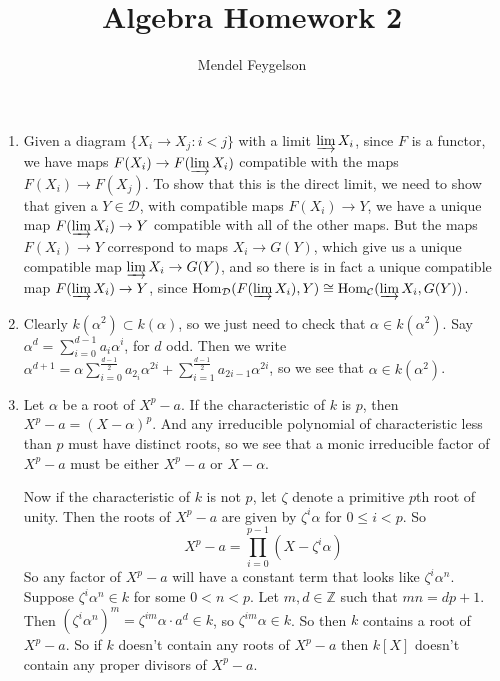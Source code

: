 \documentclass{article}
\title{Algebra Homework 2}
\author{Mendel Feygelson}
\newcommand\ZZ{\mathbb Z}
\newcommand\C{\mathcal C}
\newcommand\D{\mathcal D}
\DeclareMathOperator\Hom{Hom}
\begin{document}
\maketitle
\begin{enumerate}

   \item Given a diagram $\{X_i \to X_j : i < j\}$ with a limit $\varinjlim
      X_i$, since $F$ is a functor, we have maps $F(X_i) \to F(\varinjlim X_i)$
      compatible with the maps $F(X_i) \to F(X_j)$. To show that this is the
      direct limit, we need to show that given a $Y \in \D$, with compatible
      maps $F(X_i) \to Y$, we have a unique map $F(\varinjlim X_i) \to Y$
      compatible with all of the other maps. But the maps $F(X_i) \to Y$
      correspond to maps $X_i \to G(Y)$, which give us a unique compatible map
      $\varinjlim X_i \to G(Y)$, and so there is in fact a unique compatible map
      $F(\varinjlim X_i) \to Y$, since $\Hom_\D(F(\varinjlim X_i), Y) \cong
      \Hom_\C(\varinjlim X_i, G(Y))$.

   \item Clearly $k(\alpha^2) \subset k(\alpha)$, so we just need to check that
      $\alpha \in k(\alpha^2)$. Say $\alpha^d = \sum_{i=0}^{d-1} a_i\alpha^i$,
      for $d$ odd. Then we write $\alpha^{d+1} = \alpha\sum_{i=0}^{\frac{d-1}2}
      a_{2_i}\alpha^{2i} + \sum_{i=1}^{\frac{d-1}2} a_{2i-1}\alpha^{2i}$, so we
      see that $\alpha \in k(\alpha^2)$.

   \item Let $\alpha$ be a root of $X^p-a$. If the characteristic of $k$ is $p$,
      then $X^p-a = (X-\alpha)^p$. And any irreducible polynomial of
      characteristic less than $p$ must have distinct roots, so we see that a
      monic irreducible factor of $X^p-a$ must be either $X^p-a$ or $X-\alpha$.

      Now if the characteristic of $k$ is not $p$, let $\zeta$ denote a
      primitive $p$th root of unity. Then the roots of $X^p-a$ are given by
      $\zeta^i\alpha$ for $0 \leq i < p$. So
      \[ X^p - a = \prod_{i=0}^{p-1} (X-\zeta^i\alpha) \]
      So any factor of $X^p-a$ will have a constant term that looks like
      $\zeta^i\alpha^n$. Suppose $\zeta^i\alpha^n \in k$ for some $0<n<p$. Let
      $m,d \in \ZZ$ such that $mn = dp + 1$. Then $(\zeta^i\alpha^n)^m =
      \zeta^{im}\alpha\cdot a^d \in k$, so $\zeta^{im}\alpha \in k$. So then $k$
      contains a root of $X^p-a$. So if $k$ doesn't contain any roots of $X^p-a$
      then $k[X]$ doesn't contain any proper divisors of $X^p-a$.


\end{enumerate}
\end{document}

